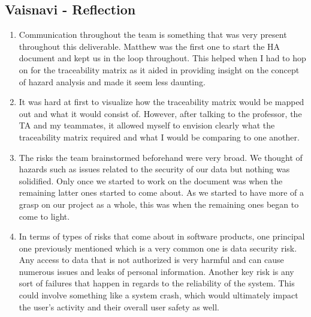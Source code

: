 \documentclass{article}
\begin{document}
\subsection*{Vaisnavi - Reflection}
\begin{enumerate}
    \item Communication throughout the team is something that was very present throughout this deliverable. Matthew was the first one to start the HA document and kept us in the loop throughout. This helped when I had to hop on for the traceability matrix as it aided in providing insight on the concept of hazard analysis and made it seem less daunting.
    \item It was hard at first to visualize how the traceability matrix would be mapped out and what it would consist of. However, after talking to the professor, the TA and my teammates, it allowed myself to envision clearly what the traceability matrix required and what I would be comparing to one another.
    \item The risks the team brainstormed beforehand were very broad. We thought of hazards such as issues related to the security of our data but nothing was solidified. Only once we started to work on the document was when the remaining latter ones started to come about. As we started to have more of a grasp on our project as a whole, this was when the remaining ones began to come to light.
    \item In terms of types of risks that come about in software products, one principal one previously mentioned which is a very common one is data security risk. Any access to data that is not authorized is very harmful and can cause numerous issues and leaks of personal information. Another key risk is any sort of failures that happen in regards to the reliability of the system. This could involve something like a system crash, which would ultimately impact the user’s activity and their overall user safety as well.
\end{enumerate}
\end{document}
